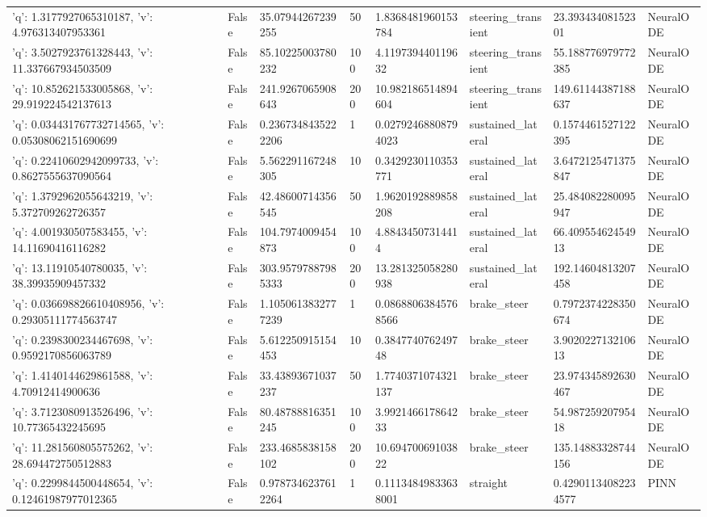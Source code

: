 \begin{tabular}{llllllll}
{'q': 1.3177927065310187, 'v': 4.976313407953361} & False & 35.07944267239255 & 50 & 1.8368481960153784 & steering\_transient & 23.39343408152301 & NeuralODE \\
{'q': 3.5027923761328443, 'v': 11.337667934503509} & False & 85.10225003780232 & 100 & 4.119739440119632 & steering\_transient & 55.188776979772385 & NeuralODE \\
{'q': 10.852621533005868, 'v': 29.919224542137613} & False & 241.9267065908643 & 200 & 10.982186514894604 & steering\_transient & 149.61144387188637 & NeuralODE \\
{'q': 0.034431767732714565, 'v': 0.05308062151690699} & False & 0.2367348435222206 & 1 & 0.02792468808794023 & sustained\_lateral & 0.1574461527122395 & NeuralODE \\
{'q': 0.22410602942099733, 'v': 0.8627555637090564} & False & 5.562291167248305 & 10 & 0.3429230110353771 & sustained\_lateral & 3.6472125471375847 & NeuralODE \\
{'q': 1.3792962055643219, 'v': 5.372709262726357} & False & 42.48600714356545 & 50 & 1.9620192889858208 & sustained\_lateral & 25.484082280095947 & NeuralODE \\
{'q': 4.001930507583455, 'v': 14.11690416116282} & False & 104.7974009454873 & 100 & 4.88434507314414 & sustained\_lateral & 66.40955462454913 & NeuralODE \\
{'q': 13.11910540780035, 'v': 38.39935909457332} & False & 303.95797887985333 & 200 & 13.281325058280938 & sustained\_lateral & 192.14604813207458 & NeuralODE \\
{'q': 0.036698826610408956, 'v': 0.29305111774563747} & False & 1.1050613832777239 & 1 & 0.08688063845768566 & brake\_steer & 0.7972374228350674 & NeuralODE \\
{'q': 0.2398300234467698, 'v': 0.9592170856063789} & False & 5.612250915154453 & 10 & 0.384774076249748 & brake\_steer & 3.902022713210613 & NeuralODE \\
{'q': 1.4140144629861588, 'v': 4.70912414900636} & False & 33.43893671037237 & 50 & 1.7740371074321137 & brake\_steer & 23.974345892630467 & NeuralODE \\
{'q': 3.7123080913526496, 'v': 10.77365432245695} & False & 80.48788816351245 & 100 & 3.992146617864233 & brake\_steer & 54.98725920795418 & NeuralODE \\
{'q': 11.281560805575262, 'v': 28.694472750512883} & False & 233.4685838158102 & 200 & 10.69470069103822 & brake\_steer & 135.14883328744156 & NeuralODE \\
{'q': 0.2299844500448654, 'v': 0.12461987977012365} & False & 0.9787346237612264 & 1 & 0.11134849833638001 & straight & 0.42901134082234577 & PINN \\

\end{tabular}
